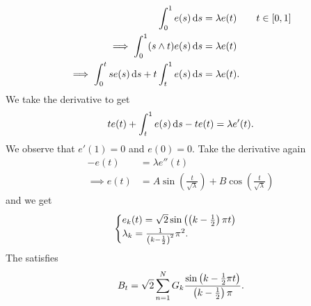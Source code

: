 \documentclass[12pt]{report}
\begin{document}
\begin{align*}
	\int_{0}^{1}e(s)\mathop{}\!\mathrm{d} s&=\lambda e(t)\qquad t\in[0,1]\\
	\implies\int_{0}^{1}(s\wedge t)e(s)\mathop{}\!\mathrm{d} s&=\lambda e(t)\\
	\implies\int_{0}^{t}se(s)\mathop{}\!\mathrm{d} s+t\int_{t}^{1}e(s)\mathop{}\!\mathrm{d} s&=\lambda e(t).
\end{align*}
We take the derivative to get
\begin{equation*}
	te(t)+\int_{t}^{1}e(s)\mathop{}\!\mathrm{d} s-te(t)=\lambda e'(t).
\end{equation*}
We observe that $e'(1)=0$ and $e(0)=0$. Take the derivative again
\begin{align*}
	-e(t)&=\lambda e''(t)\\
	\implies e(t)&=A\sin\left(\frac{t}{\sqrt{\lambda}}\right)+B\cos\left(\frac{t}{\sqrt{\lambda}}\right)
\end{align*}
and we get 
\begin{equation*}
	\begin{cases}
		e_k(t)=\sqrt{2}\sin\left(\left(k-\frac{1}{2}\right)\pi t\right)\\
		\lambda_k=\frac{1}{\left(k-\frac{1}{2}\right)^{2}}\pi^{2}.
	\end{cases}
\end{equation*}
The \bwm{} satisfies
\begin{equation*}
	B_t=\sqrt{2}\sum_{n=1}^{N}G_k\frac{\sin\left(k-\frac{1}{2}\pi t\right)}{\left(k-\frac{1}{2}\right)\pi}.
\end{equation*}
\end{document}
